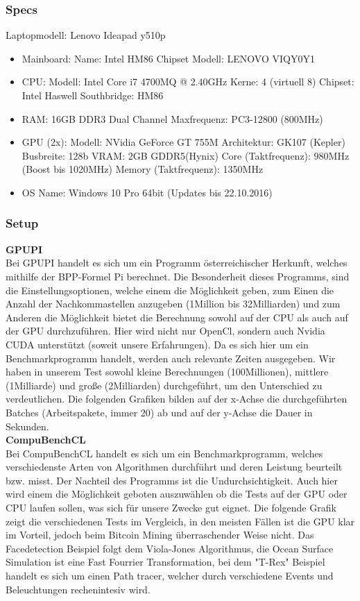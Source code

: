 \subsubsection{Specs}
Laptopmodell: Lenovo Ideapad y510p\\
\begin{itemize}
	\item Mainboard:
	\subitem Name: Intel HM86 Chipset
	\subitem Modell: LENOVO VIQY0Y1
	\item CPU:
	\subitem Modell: Intel Core i7 4700MQ @ 2.40GHz
	\subitem Kerne: 4 (virtuell 8)
	\subitem Chipset: Intel Haswell
	\subitem Southbridge: HM86
	\subitem 
	\item RAM:
	\subitem 16GB DDR3
	\subitem Dual Channel
	\subitem Maxfrequenz: PC3-12800 (800MHz)
	\item GPU (2x):
	\subitem Modell: NVidia GeForce GT 755M
	\subitem Architektur: GK107 (Kepler)
	\subitem Busbreite: 128b
	\subitem VRAM: 2GB GDDR5(Hynix)
	\subitem Core (Taktfrequenz): 980MHz (Boost bis 1020MHz)
	\subitem Memory (Taktfrequenz): 1350MHz
	\item OS
	\subitem Name: Windows 10 Pro 64bit (Updates bis 22.10.2016)	
\end{itemize}
\subsubsection{Setup}
\textbf{GPUPI}\\
Bei GPUPI handelt es sich um ein Programm österreichischer Herkunft, welches mithilfe der BPP-Formel Pi berechnet. Die Besonderheit dieses Programms, sind die Einstellungsoptionen, welche einem die Möglichkeit geben, zum Einen die Anzahl der Nachkommastellen anzugeben (1Million bis 32Milliarden) und zum Anderen die Möglichkeit bietet die Berechnung sowohl auf der CPU als auch auf der GPU durchzuführen. Hier wird nicht nur OpenCl, sondern auch Nvidia CUDA unterstützt (soweit unsere Erfahrungen). Da es sich hier um ein Benchmarkprogramm handelt, werden auch relevante Zeiten ausgegeben. Wir haben in unserem Test sowohl kleine Berechnungen (100Millionen), mittlere (1Milliarde) und große (2Milliarden) durchgeführt, um den Unterschied zu verdeutlichen.
Die folgenden Grafiken bilden auf der x-Achse die durchgeführten Batches (Arbeitspakete, immer 20) ab und auf der y-Achse die Dauer in Sekunden.\cite{gpupi}\\[0.3cm]
\textbf{CompuBenchCL}\\
Bei CompuBenchCL handelt es sich um ein Benchmarkprogramm, welches verschiedenste Arten von Algorithmen durchführt und deren Leistung beurteilt bzw. misst. Der Nachteil des Programms ist die Undurchsichtigkeit.
Auch hier wird einem die Möglichkeit geboten auszuwählen ob die Tests auf der GPU oder CPU laufen sollen, was sich für unsere Zwecke gut eignet. 
Die folgende Grafik zeigt die verschiedenen Tests im Vergleich, in den meisten Fällen ist die GPU klar im Vorteil, jedoch beim Bitcoin Mining überraschender Weise nicht.
Das Facedetection Beispiel folgt dem Viola-Jones Algorithmus, die Ocean Surface Simulation ist eine Fast Fourrier Transformation, bei dem "T-Rex" Beispiel handelt es sich um einen Path tracer, welcher durch verschiedene Events und Beleuchtungen rechenintesiv wird. \cite{compubench}
